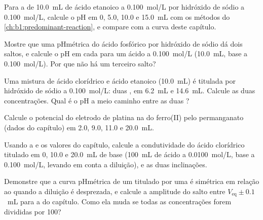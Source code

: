 \begin{exercise}[$\star\star$]\label{exo:b1:titration-methods:5}
Para a  de \qty{10.0}{mL} de ácido etanoico a \qty{0.100}{mol/L}
por hidróxido de sódio a \qty{0.100}{mol/L}, calcule o pH em 0, 5.0, 10.0
e \qty{15.0}{mL} com os métodos do \cref{ch:b1:predominant-reaction}, e
compare com a curva deste capítulo.
\end{exercise}

\begin{exercise}[$\star\star$]\label{exo:b1:titration-methods:6}
Mostre que uma  pHmétrica do ácido fosfórico por hidróxido de
sódio dá dois saltos, e calcule o pH em cada  para um ácido
a \qty{0.100}{mol/L} (\qty{10.0}{mL}, base a \qty{0.100}{mol/L}). Por que
não há um terceiro salto?
\end{exercise}

\begin{exercise}[$\star\star$]\label{exo:b1:titration-methods:7}
Uma mistura de ácido clorídrico e ácido etanoico (\qty{10.0}{mL}) é
titulada por hidróxido de sódio a \qty{0.100}{mol/L}: duas ,
em \qty{6.2}{mL} e \qty{14.6}{mL}. Calcule as duas concentrações. Qual é
o pH a meio caminho entre as duas ?
\end{exercise}

\begin{exercise}[$\star\star$]\label{exo:b1:titration-methods:8}
Calcule o potencial do eletrodo de platina na  do ferro(II) pelo
permanganato (dados do capítulo) em 2.0, 9.0, 11.0 e \qty{20.0}{mL}.
\end{exercise}

\begin{exercise}[$\star\star$]\label{exo:b1:titration-methods:9}
Usando a  e os valores do capítulo, calcule a
condutividade do ácido clorídrico titulado em 0, 10.0 e \qty{20.0}{mL} de
base (\qty{100}{mL} de ácido a \qty{0.0100}{mol/L}, base a
\qty{0.100}{mol/L}, levando em conta a diluição), e as duas inclinações.
\end{exercise}

\begin{exercise}[$\star\star\star$]\label{exo:b1:titration-methods:10}
Demonstre que a curva pHmétrica de um  titulado por uma  é simétrica em relação ao  quando a diluição
é desprezada, e calcule a amplitude do salto entre
$V_{\mathrm{eq}} \pm 0.1$~mL para a  do capítulo. Como ela muda
se todas as concentrações forem divididas por 100?
\end{exercise}

